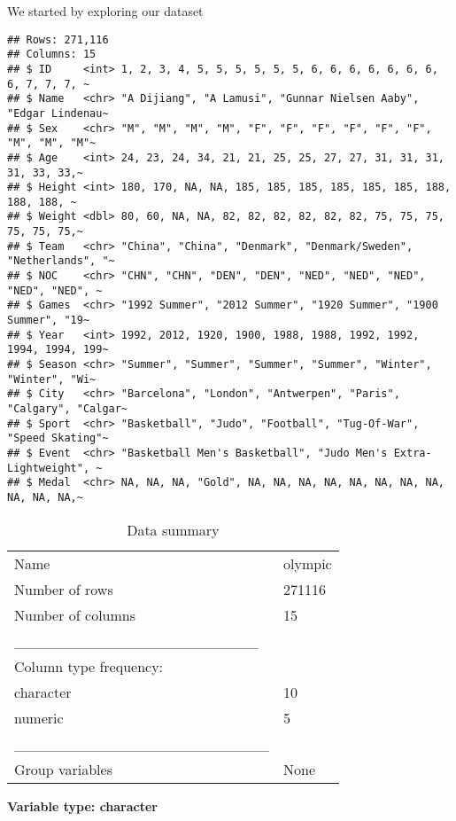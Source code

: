 \documentclass[
  ignorenonframetext,
]{beamer}
\begin{document}
\begin{frame}[fragile]{We started by exploring our dataset}
\protect\hypertarget{we-started-by-exploring-our-dataset}{}
\begin{verbatim}
## Rows: 271,116
## Columns: 15
## $ ID     <int> 1, 2, 3, 4, 5, 5, 5, 5, 5, 5, 6, 6, 6, 6, 6, 6, 6, 6, 7, 7, 7, ~
## $ Name   <chr> "A Dijiang", "A Lamusi", "Gunnar Nielsen Aaby", "Edgar Lindenau~
## $ Sex    <chr> "M", "M", "M", "M", "F", "F", "F", "F", "F", "F", "M", "M", "M"~
## $ Age    <int> 24, 23, 24, 34, 21, 21, 25, 25, 27, 27, 31, 31, 31, 31, 33, 33,~
## $ Height <int> 180, 170, NA, NA, 185, 185, 185, 185, 185, 185, 188, 188, 188, ~
## $ Weight <dbl> 80, 60, NA, NA, 82, 82, 82, 82, 82, 82, 75, 75, 75, 75, 75, 75,~
## $ Team   <chr> "China", "China", "Denmark", "Denmark/Sweden", "Netherlands", "~
## $ NOC    <chr> "CHN", "CHN", "DEN", "DEN", "NED", "NED", "NED", "NED", "NED", ~
## $ Games  <chr> "1992 Summer", "2012 Summer", "1920 Summer", "1900 Summer", "19~
## $ Year   <int> 1992, 2012, 1920, 1900, 1988, 1988, 1992, 1992, 1994, 1994, 199~
## $ Season <chr> "Summer", "Summer", "Summer", "Summer", "Winter", "Winter", "Wi~
## $ City   <chr> "Barcelona", "London", "Antwerpen", "Paris", "Calgary", "Calgar~
## $ Sport  <chr> "Basketball", "Judo", "Football", "Tug-Of-War", "Speed Skating"~
## $ Event  <chr> "Basketball Men's Basketball", "Judo Men's Extra-Lightweight", ~
## $ Medal  <chr> NA, NA, NA, "Gold", NA, NA, NA, NA, NA, NA, NA, NA, NA, NA, NA,~
\end{verbatim}

\begin{longtable}[]{@{}ll@{}}
\caption{Data summary}\tabularnewline
\toprule()
\endhead
Name & olympic \\
Number of rows & 271116 \\
Number of columns & 15 \\
\_\_\_\_\_\_\_\_\_\_\_\_\_\_\_\_\_\_\_\_\_\_\_ & \\
Column type frequency: & \\
character & 10 \\
numeric & 5 \\
\_\_\_\_\_\_\_\_\_\_\_\_\_\_\_\_\_\_\_\_\_\_\_\_ & \\
Group variables & None \\
\bottomrule()
\end{longtable}

\textbf{Variable type: character}


\end{frame}
\end{document}
